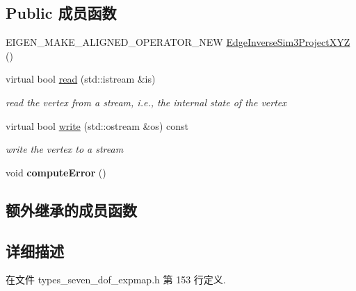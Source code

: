 \subsection*{Public 成员函数}
\begin{DoxyCompactItemize}
\item 
E\-I\-G\-E\-N\-\_\-\-M\-A\-K\-E\-\_\-\-A\-L\-I\-G\-N\-E\-D\-\_\-\-O\-P\-E\-R\-A\-T\-O\-R\-\_\-\-N\-E\-W \hyperlink{classg2o_1_1EdgeInverseSim3ProjectXYZ_af4e344ee9f610b41eea60b5914a776bd}{Edge\-Inverse\-Sim3\-Project\-X\-Y\-Z} ()
\item 
\hypertarget{classg2o_1_1EdgeInverseSim3ProjectXYZ_ac229f31599a4f08eebe8f9b239d883f6}{virtual bool \hyperlink{classg2o_1_1EdgeInverseSim3ProjectXYZ_ac229f31599a4f08eebe8f9b239d883f6}{read} (std\-::istream \&is)}\label{classg2o_1_1EdgeInverseSim3ProjectXYZ_ac229f31599a4f08eebe8f9b239d883f6}

\begin{DoxyCompactList}\small\item\em read the vertex from a stream, i.\-e., the internal state of the vertex \end{DoxyCompactList}\item 
\hypertarget{classg2o_1_1EdgeInverseSim3ProjectXYZ_a9df647cceceabdecd26692647211e043}{virtual bool \hyperlink{classg2o_1_1EdgeInverseSim3ProjectXYZ_a9df647cceceabdecd26692647211e043}{write} (std\-::ostream \&os) const }\label{classg2o_1_1EdgeInverseSim3ProjectXYZ_a9df647cceceabdecd26692647211e043}

\begin{DoxyCompactList}\small\item\em write the vertex to a stream \end{DoxyCompactList}\item 
\hypertarget{classg2o_1_1EdgeInverseSim3ProjectXYZ_a8fa376524e861ae8c4f1a360d217f02d}{void {\bfseries compute\-Error} ()}\label{classg2o_1_1EdgeInverseSim3ProjectXYZ_a8fa376524e861ae8c4f1a360d217f02d}

\end{DoxyCompactItemize}
\subsection*{额外继承的成员函数}


\subsection{详细描述}


在文件 types\-\_\-seven\-\_\-dof\-\_\-expmap.\-h 第 153 行定义.




